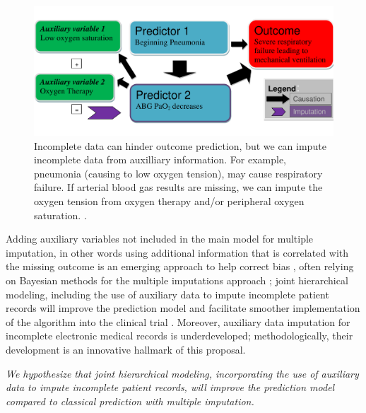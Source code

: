 \documentclass[11pt,notitlepage]{article}
\begin{document}
\begin{figure} 
 \vspace{-30pt}
 \includegraphics[scale=0.4]{Figures/Bayesian_imputation.pdf}
    \vspace{-20pt}
  \caption{\footnotesize Incomplete data can hinder outcome prediction, but we can impute incomplete data from auxilliary information. For example, pneumonia (causing to low oxygen tension), may cause respiratory failure. If arterial blood gas results are missing, we can impute the oxygen tension from oxygen therapy and/or peripheral oxygen saturation.  \cite{Hall_25389642}.}
   \vspace{-20pt}
    \label{fig:Imputation_fig}
\end{figure}

Adding auxiliary variables not included in the main model for multiple imputation, in other words using additional information that is correlated with the missing outcome is an emerging approach to help correct bias \cite{Meng_1994, Collins_11778676, Rubin_1996}, often relying on Bayesian methods for the multiple imputations approach \cite{Daniels_2008, Schafer_1997}; joint hierarchical modeling, including the use of auxiliary data to impute incomplete patient records will improve the prediction model and facilitate smoother implementation of the algorithm into the clinical trial \cite{Hall_25389642}. Moreover, auxiliary data imputation for incomplete electronic medical records is underdeveloped; methodologically, their development is an innovative hallmark of this proposal.\newline

\emph{We hypothesize that joint hierarchical modeling, incorporating the use of auxiliary data to impute incomplete patient records, will improve the prediction model compared to classical prediction with multiple imputation.}
\end{document}

